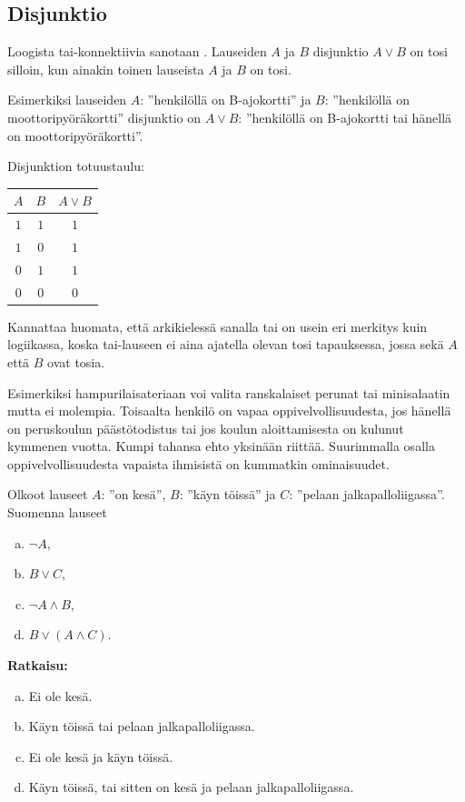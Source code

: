 \bigskip

\subsection*{Disjunktio} Loogista tai-konnektiivia sanotaan . Lauseiden $A$ ja $B$ disjunktio $A\lor B$ on tosi silloin, kun ainakin toinen lauseista $A$ ja $B$ on tosi.


Esimerkiksi lauseiden $A$: ''henkilöllä on B-ajokortti'' ja $B$: ''henkilöllä on moottoripyöräkortti'' disjunktio on $A \lor B$: ''henkilöllä on B-ajokortti tai hänellä on moottoripyöräkortti''. 

Disjunktion totuustaulu:
 
\bigskip

\begin{center}
\begin{tabular}{|c|c|c|}\hline
$A$ & $B$ & $A\lor B$ \\ \hline
$1$ & $1$ & $1$\\ 
$1$ & $0$ & $1$\\
$0$ & $1$ & $1$\\
$0$ & $0$ & $0$\\ \hline
\end{tabular}
\end{center}

\bigskip

Kannattaa huomata, että arkikielessä sanalla tai on usein eri merkitys kuin logiikassa, koska tai-lauseen ei aina ajatella olevan tosi tapauksessa, jossa sekä $A$ että $B$ ovat tosia.

Esimerkiksi hampurilaisateriaan voi valita ranskalaiset perunat tai minisalaatin mutta ei molempia. Toisaalta henkilö on vapaa oppivelvollisuudesta, jos hänellä on peruskoulun päästötodistus tai jos koulun aloittamisesta on kulunut kymmenen vuotta. Kumpi tahansa ehto yksinään riittää. Suurimmalla osalla oppivelvollisuudesta vapaista ihmisistä on kummatkin ominaisuudet.

\begin{esimerkki}
Olkoot lauseet $A$: ''on kesä'', $B$: ''käyn töissä'' ja $C$: ''pelaan jalkapalloliigassa''. Suomenna lauseet
\begin{enumerate}[a)]
\item $\lnot A$, 
\item $B\lor C$,
\item $\lnot A\land B$,
\item $B\lor (A\land C)$.
\end{enumerate}

{\bf Ratkaisu:}
\begin{enumerate}[a)]
\item Ei ole kesä.
\item Käyn töissä tai pelaan jalkapalloliigassa.
\item Ei ole kesä ja käyn töissä.
\item Käyn töissä, tai sitten on kesä ja pelaan jalkapalloliigassa.
\end{enumerate}
\end{esimerkki}


